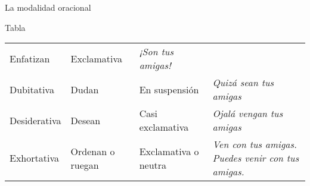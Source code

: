\documentclass[ignorenonframetext,]{beamer}
\begin{document}
\begin{frame}{La modalidad oracional}
\begin{block}{Tabla}
\begin{longtable}[]{@{}llll@{}}
\begin{minipage}[t]{0.14\columnwidth}
Enfatizan\strut
\end{minipage} & \begin{minipage}[t]{0.18\columnwidth}\raggedright
Exclamativa\strut
\end{minipage} & \begin{minipage}[t]{0.41\columnwidth}\raggedright
\emph{¡Son tus amigas!}\strut
\end{minipage}\tabularnewline
\begin{minipage}[t]{0.15\columnwidth}\raggedright
Dubitativa\strut
\end{minipage} & \begin{minipage}[t]{0.14\columnwidth}\raggedright
Dudan\strut
\end{minipage} & \begin{minipage}[t]{0.18\columnwidth}\raggedright
En suspensión\strut
\end{minipage} & \begin{minipage}[t]{0.41\columnwidth}\raggedright
\emph{Quizá sean tus amigas}\strut
\end{minipage}\tabularnewline
\begin{minipage}[t]{0.15\columnwidth}\raggedright
Desiderativa\strut
\end{minipage} & \begin{minipage}[t]{0.14\columnwidth}\raggedright
Desean\strut
\end{minipage} & \begin{minipage}[t]{0.18\columnwidth}\raggedright
Casi exclamativa\strut
\end{minipage} & \begin{minipage}[t]{0.41\columnwidth}\raggedright
\emph{Ojalá vengan tus amigas}\strut
\end{minipage}\tabularnewline
\begin{minipage}[t]{0.15\columnwidth}\raggedright
Exhortativa\strut
\end{minipage} & \begin{minipage}[t]{0.14\columnwidth}\raggedright
Ordenan o ruegan\strut
\end{minipage} & \begin{minipage}[t]{0.18\columnwidth}\raggedright
Exclamativa o neutra\strut
\end{minipage} & \begin{minipage}[t]{0.41\columnwidth}\raggedright
\emph{Ven con tus amigas.} \emph{Puedes venir con tus amigas.}\strut
\end{minipage}\tabularnewline
\bottomrule
\end{longtable}


\end{block}
\end{frame}
\end{document}
